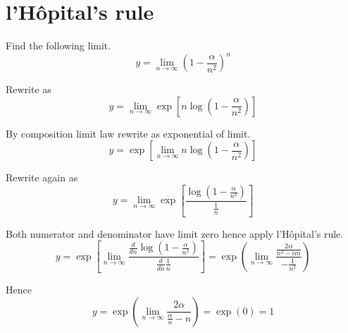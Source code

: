 

\section*{l'H\^opital's rule}

Find the following limit.
\begin{equation*}
y=\lim_{n\rightarrow\infty}\left(1-\frac{\alpha}{n^2}\right)^n
\end{equation*}

Rewrite as
\begin{equation*}
y=\lim_{n\rightarrow\infty}\exp\left[n\log\left(1-\frac{\alpha}{n^2}\right)\right]
\end{equation*}

By composition limit law rewrite as exponential of limit.
\begin{equation*}
y=\exp\left[
\lim_{n\rightarrow\infty}
n\log\left(1-\frac{\alpha}{n^2}\right)
\right]
\end{equation*}

Rewrite again as
\begin{equation*}
y=\lim_{n\rightarrow\infty}\exp\left[\frac{\log\left(1-\frac{\alpha}{n^2}\right)}{\frac{1}{n}}\right]
\end{equation*}

Both numerator and denominator have limit zero hence apply l'H\^opital's rule.
\begin{equation*}
y=\exp\left[
\lim_{n\rightarrow\infty}
\frac{\frac{d}{dn}\log\left(1-\frac{\alpha}{n^2}\right)}
{\frac{d}{dn}\frac{1}{n}}
\right]
=\exp\left(
\lim_{n\rightarrow\infty}
\frac
{\frac{2\alpha}{n^3-\alpha n}}
{-\frac{1}{n^2}}
\right)
\end{equation*}

Hence
\begin{equation*}
y=\exp\left(
\lim_{n\rightarrow\infty}
\frac{2\alpha}{\frac{\alpha}{n}-n}
\right)
=\exp(0)=1
\end{equation*}



